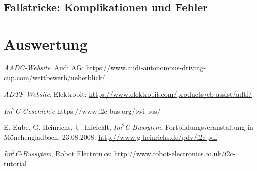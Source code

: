 \documentclass[12pt, a4paper]{scrartcl}
\begin{document}
\subsection{Fallstricke: Komplikationen und Fehler}


\newpage
\section{Auswertung}

\newpage
{}
\listoffigures

\newpage
{}
\begin{thebibliography}{9}
	\textit{AADC-Website},
	Audi AG:
	\url{https://www.audi-autonomous-driving-cup.com/wettbewerb/ueberblick/}
	
	\textit{ADTF-Website},
	Elektrobit:
	\url{https://www.elektrobit.com/products/eb-assist/adtf/}
	
	\textit{Im$^2$C-Geschichte}
	\url{https://www.i2c-bus.org/twi-bus/}
	
	E. Eube, G. Heinrichs, U. Ihlefeldt,
	\textit{Im$^2$C-Bussytem},
	Fortbildungsveranstaltung in Mönchengladbach, 23.08.2008:
	\url{http://www.g-heinrichs.de/pdv/i2c.pdf}
	
	\textit{Im$^2$C-Bussytem},
	Robot Electronics:
	\url{http://www.robot-electronics.co.uk/i2c-tutorial}

\end{thebibliography}
\end{document}
